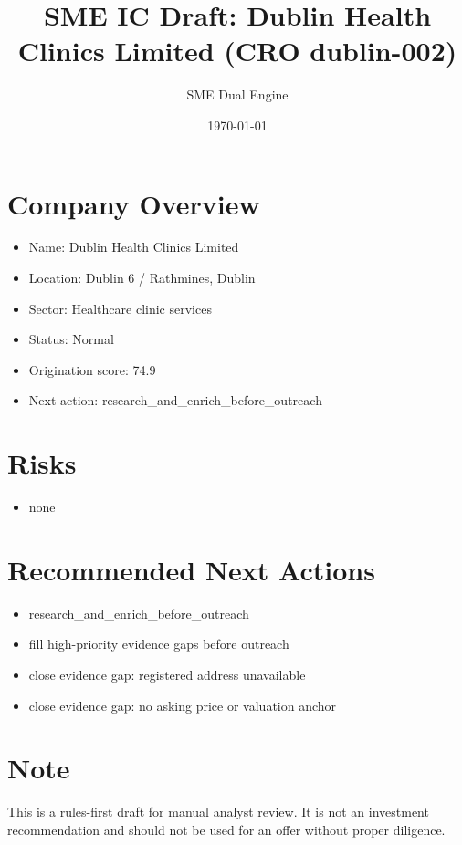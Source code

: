 \documentclass[11pt,a4paper]{article}
\title{SME IC Draft: Dublin Health Clinics Limited (CRO dublin-002)}
\author{SME Dual Engine}
\date{\today}
\begin{document}
\maketitle
\section*{Company Overview}
\begin{itemize}[leftmargin=1.4em]
\item Name: Dublin Health Clinics Limited
\item Location: Dublin 6 / Rathmines, Dublin
\item Sector: Healthcare clinic services
\item Status: Normal
\item Origination score: 74.9
\item Next action: research\_and\_enrich\_before\_outreach
\end{itemize}
\section*{Risks}
\begin{itemize}[leftmargin=1.4em]
\item none
\end{itemize}
\section*{Recommended Next Actions}
\begin{itemize}[leftmargin=1.4em]
\item research\_and\_enrich\_before\_outreach
\item fill high-priority evidence gaps before outreach
\item close evidence gap: registered address unavailable
\item close evidence gap: no asking price or valuation anchor
\end{itemize}
\section*{Note}
This is a rules-first draft for manual analyst review. It is not an investment
recommendation and should not be used for an offer without proper diligence.
\end{document}
